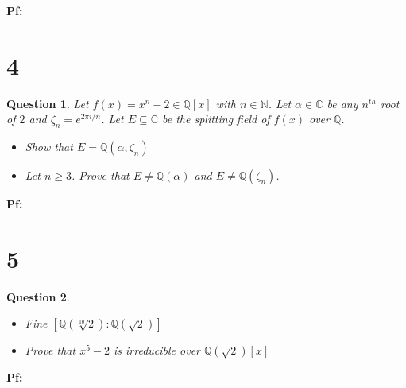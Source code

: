 \documentclass{article}
\newtheorem{question}{Question}
\begin{document}
\textbf{Pf:}

\break

\section*{4}
\begin{myBox}[]{}
    \begin{question}
        Let $f(x)=x^n-2\in\mathbb{Q}[x]$ with $n\in\mathbb{N}$. Let $\alpha\in\mathbb{C}$ be any $n^{th}$ root of $2$ and $\zeta_n=e^{2\pi i/n}$.
        Let $E\subseteq \mathbb{C}$ be the splitting field of $f(x)$ over $\mathbb{Q}$.
        \begin{itemize}
            \item[(a)] Show that $E=\mathbb{Q}(\alpha,\zeta_n)$
            \item[(b)] Let $n\geq 3$. Prove that $E\neq\mathbb{Q}(\alpha)$ and $E\neq\mathbb{Q}(\zeta_n)$. 
        \end{itemize}
    \end{question}
\end{myBox}

\textbf{Pf:}

\break

\section*{5}
\begin{myBox}[]{}
    \begin{question}
        \begin{itemize}
            \item[(a)] Fine $[\mathbb{Q}(\sqrt[10]{2}):\mathbb{Q}(\sqrt{2})]$
            \item[(b)] Prove that $x^5-2$ is irreducible over $\mathbb{Q}(\sqrt{2})[x]$ 
        \end{itemize}
    \end{question}
\end{myBox}

\textbf{Pf:}
\end{document}
